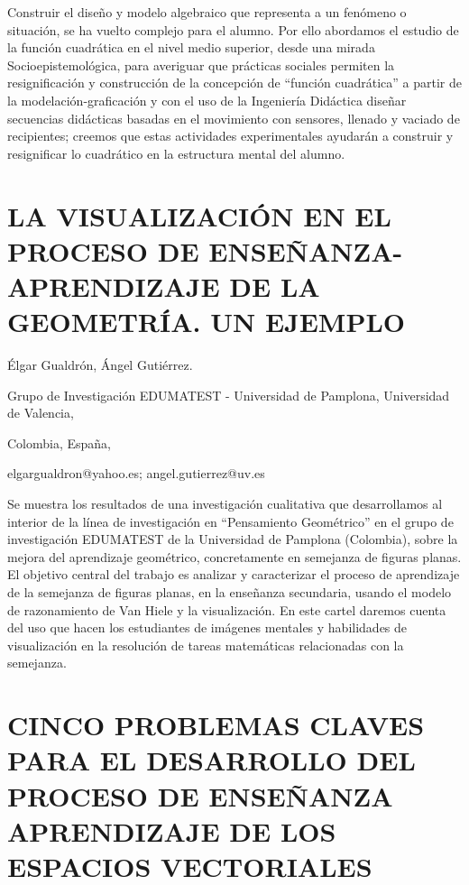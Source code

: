 Construir el diseño y modelo algebraico que representa a un fenómeno
o situación, se ha vuelto complejo para el alumno. Por ello abordamos
el estudio de la función cuadrática en el nivel medio superior, desde
una mirada Socioepistemológica, para averiguar que prácticas sociales
permiten la resignificación y construcción de la concepción de “función
cuadrática” a partir de la modelación-graficación y con el uso de
la Ingeniería Didáctica diseñar secuencias didácticas basadas en el
movimiento con sensores, llenado y vaciado de recipientes; creemos
que estas actividades experimentales ayudarán a construir y resignificar
lo cuadrático en la estructura mental del alumno. 


\section{LA VISUALIZACIÓN EN EL PROCESO DE ENSEÑANZA-APRENDIZAJE DE LA GEOMETRÍA.
UN EJEMPLO}

\begin{datos}

Élgar Gualdrón, Ángel Gutiérrez.

Grupo de Investigación EDUMATEST - Universidad de Pamplona, Universidad
de Valencia,

Colombia, España,

elgargualdron@yahoo.es; angel.gutierrez@uv.es

\end{datos}

Se muestra los resultados de una investigación cualitativa que desarrollamos
al interior de la línea de investigación en “Pensamiento Geométrico”
en el grupo de investigación EDUMATEST de la Universidad de Pamplona
(Colombia), sobre la mejora del aprendizaje geométrico, concretamente
en semejanza de figuras planas. El objetivo central del trabajo es
analizar y caracterizar el proceso de aprendizaje de la semejanza
de figuras planas, en la enseñanza secundaria, usando el modelo de
razonamiento de Van Hiele y la visualización. En este cartel daremos
cuenta del uso que hacen los estudiantes de imágenes mentales y habilidades
de visualización en la resolución de tareas matemáticas relacionadas
con la semejanza. 


\section{CINCO PROBLEMAS CLAVES PARA EL DESARROLLO DEL PROCESO DE ENSEÑANZA
APRENDIZAJE DE LOS ESPACIOS VECTORIALES}

